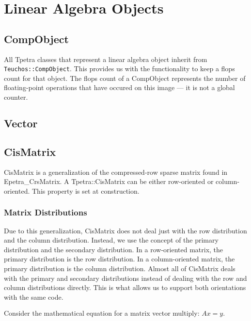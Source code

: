 \documentclass[10pt,relax]{TpetraDesign}
\begin{document}
%
\section{Linear Algebra Objects}

%
\subsection{CompObject}
All Tpetra classes that represent a linear algebra object inherit from \texttt{Teuchos::CompObject}. This provides us with the functionality to keep a flops count for that object. The flops count of a CompObject represents the number of floating-point operations that have occured on this image --- it is not a global counter.

\subsection{Vector}

%
\subsection{CisMatrix}
CisMatrix is a generalization of the compressed-row sparse matrix found in Epetra\_CrsMatrix. A Tpetra::CisMatrix can be either row-oriented or column-oriented. This property is set at construction. 

\subsubsection*{Matrix Distributions}
Due to this generalization, CisMatrix does not deal just with the row distribution and the column distribution. Instead, we use the concept of the primary distribution and the secondary distribution. In a row-oriented matrix, the primary distribution is the row distribution. In a column-oriented matrix, the primary distribution is the column distribution. Almost all of CisMatrix deals with the primary and secondary distributions instead of dealing with the row and column  distributions directly. This is what allows us to support both orientations with the same code.

Consider the mathematical equation for a matrix vector multiply: $Ax = y$.
\end{document}
